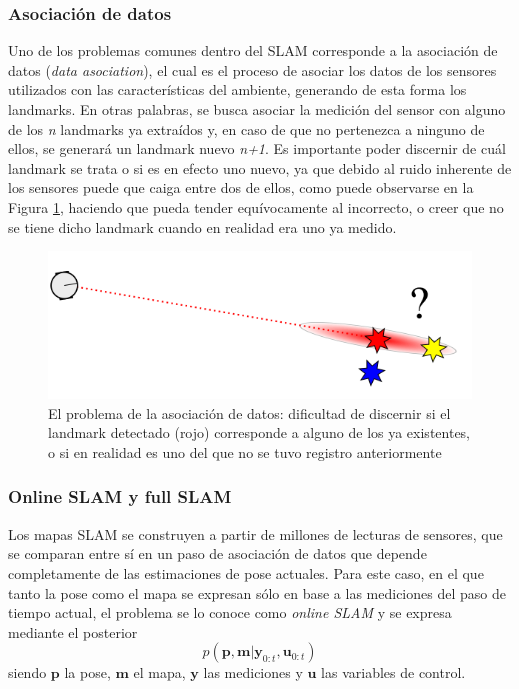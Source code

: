 \subsubsection{Asociación de datos}
Uno de los problemas comunes dentro del SLAM corresponde a la asociación de datos (\textit{data asociation}), el cual es el proceso de asociar los datos de los sensores utilizados con las características del ambiente, generando de esta forma los landmarks. En otras palabras, se busca asociar la medición del sensor con alguno de los \textit{n} landmarks ya extraídos y, en caso de que no pertenezca a ninguno de ellos, se generará un landmark nuevo \textit{n+1}. Es importante poder discernir de cuál landmark se trata o si es en efecto uno nuevo, ya que debido al ruido inherente de los sensores puede que caiga entre dos de ellos, como puede observarse en la Figura \ref{fig:dataassociation}, haciendo que pueda tender equívocamente al incorrecto, o creer que no se tiene dicho landmark cuando en realidad era uno ya medido.

\begin{figure}[!ht]
    \centering
    \includegraphics[width=\textwidth]{Img/DataAssociation.png}
    \caption{El problema de la asociación de datos: dificultad de discernir si el landmark detectado (rojo) corresponde a alguno de los ya existentes, o si en realidad es uno del que no se tuvo registro anteriormente}
    \label{fig:dataassociation}
\end{figure}

\subsubsection{Online SLAM y full SLAM}
Los mapas SLAM se construyen a partir de millones de lecturas de sensores, que se comparan entre sí en un paso de asociación de datos que depende completamente de las estimaciones de pose actuales. Para este caso, en el que tanto la pose como el mapa se expresan sólo en base a las mediciones del paso de tiempo actual, el problema se lo conoce como \textit{online SLAM} y se expresa mediante el posterior
\begin{equation}
    p(\bm{p},\bm{m}|\bm{y}_{0:t},\bm{u}_{0:t})
\end{equation}
siendo $\bm{p}$ la pose, $\bm{m}$ el mapa, $\bm{y}$ las mediciones y $\bm{u}$ las variables de control.

